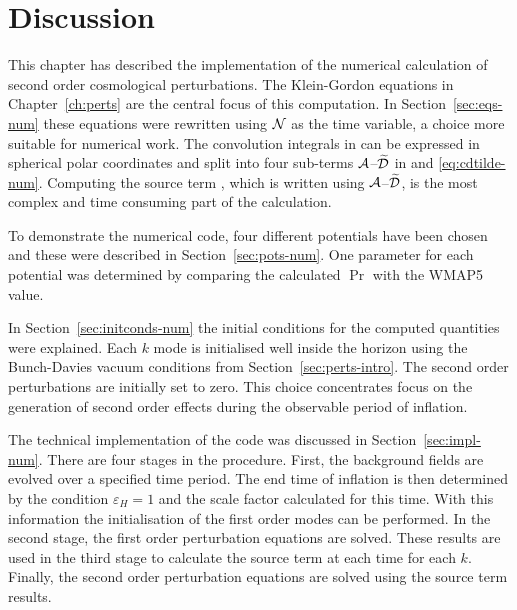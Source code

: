 % 
% 
% 

\section{Discussion}
\label{sec:disc-numerical}
This chapter has described the implementation of the numerical calculation of second
order cosmological perturbations.
The Klein-Gordon equations in Chapter~\ref{ch:perts} are the central focus of this
computation. In Section~\ref{sec:eqs-num} these equations were rewritten using $\mathcal{N}$
as the time variable, a choice more suitable for numerical work. The convolution
integrals in  can be expressed in spherical polar
coordinates and split into four sub-terms $\mathcal{A}$--$\widetilde{\mathcal{D}}$ in  and
\eqref{eq:cdtilde-num}. Computing the source term
, which is written using $\mathcal{A}$--$\widetilde{\mathcal{D}}$, is the most complex
and
time consuming part of the calculation.

To demonstrate the numerical code, four different potentials have been chosen and
these were described in Section~\ref{sec:pots-num}. One parameter for each
potential was determined by comparing the calculated $\Pr$ with the WMAP5 value.

In Section~\ref{sec:initconds-num} the initial conditions for the computed
quantities were explained. Each $k$ mode is initialised well inside the horizon
using the Bunch-Davies vacuum conditions from Section~\ref{sec:perts-intro}. The
second order perturbations are initially set to zero. This choice
concentrates focus
on the generation of second order effects during the observable period of
inflation.


The technical implementation of the code was discussed in
Section~\ref{sec:impl-num}. There are four stages in the procedure. First, the
background fields are evolved over a specified time period. The end time of
inflation is then determined by the condition $\varepsilon_H=1$ and the scale factor
calculated for this time. With this
information the initialisation of the first order modes can be performed. In the
second stage, the first order perturbation equations are solved. These results are
used in the third stage to calculate the source term  at each
time for each $k$. Finally, the second order perturbation equations are solved using
the source term results.

